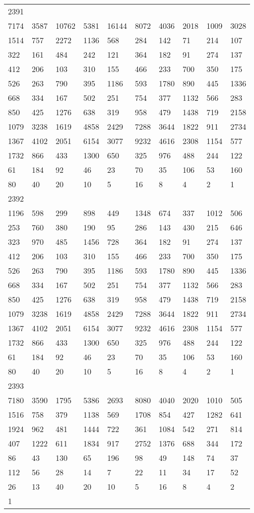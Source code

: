 \begin{longtable}{*{10}{l}}
2391&&&&&&&&&\\
7174& 3587& 10762& 5381& 16144& 8072& 4036& 2018& 1009& 3028\\
1514& 757& 2272& 1136& 568& 284& 142& 71& 214& 107\\
322& 161& 484& 242& 121& 364& 182& 91& 274& 137\\
412& 206& 103& 310& 155& 466& 233& 700& 350& 175\\
526& 263& 790& 395& 1186& 593& 1780& 890& 445& 1336\\
668& 334& 167& 502& 251& 754& 377& 1132& 566& 283\\
850& 425& 1276& 638& 319& 958& 479& 1438& 719& 2158\\
1079& 3238& 1619& 4858& 2429& 7288& 3644& 1822& 911& 2734\\
1367& 4102& 2051& 6154& 3077& 9232& 4616& 2308& 1154& 577\\
1732& 866& 433& 1300& 650& 325& 976& 488& 244& 122\\
61& 184& 92& 46& 23& 70& 35& 106& 53& 160\\
80& 40& 20& 10& 5& 16& 8& 4& 2& 1\\

2392&&&&&&&&&\\
1196& 598& 299& 898& 449& 1348& 674& 337& 1012& 506\\
253& 760& 380& 190& 95& 286& 143& 430& 215& 646\\
323& 970& 485& 1456& 728& 364& 182& 91& 274& 137\\
412& 206& 103& 310& 155& 466& 233& 700& 350& 175\\
526& 263& 790& 395& 1186& 593& 1780& 890& 445& 1336\\
668& 334& 167& 502& 251& 754& 377& 1132& 566& 283\\
850& 425& 1276& 638& 319& 958& 479& 1438& 719& 2158\\
1079& 3238& 1619& 4858& 2429& 7288& 3644& 1822& 911& 2734\\
1367& 4102& 2051& 6154& 3077& 9232& 4616& 2308& 1154& 577\\
1732& 866& 433& 1300& 650& 325& 976& 488& 244& 122\\
61& 184& 92& 46& 23& 70& 35& 106& 53& 160\\
80& 40& 20& 10& 5& 16& 8& 4& 2& 1\\

2393&&&&&&&&&\\
7180& 3590& 1795& 5386& 2693& 8080& 4040& 2020& 1010& 505\\
1516& 758& 379& 1138& 569& 1708& 854& 427& 1282& 641\\
1924& 962& 481& 1444& 722& 361& 1084& 542& 271& 814\\
407& 1222& 611& 1834& 917& 2752& 1376& 688& 344& 172\\
86& 43& 130& 65& 196& 98& 49& 148& 74& 37\\
112& 56& 28& 14& 7& 22& 11& 34& 17& 52\\
26& 13& 40& 20& 10& 5& 16& 8& 4& 2\\
1& \\


\end{longtable}
